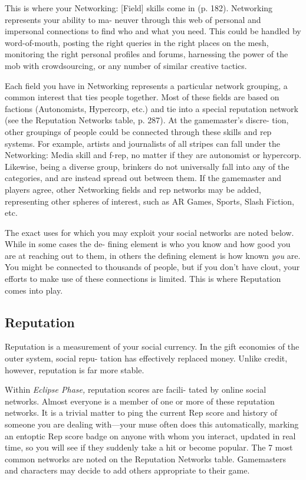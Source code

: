 This is where your Networking: [Field] skills come 
in (p. 182). Networking represents your ability to ma-
neuver through this web of personal and impersonal 
connections to find who and what you need. This 
could be handled by word-of-mouth, posting the right 
queries in the right places on the mesh, monitoring 
the right personal profiles and forums, harnessing the 
power of the mob with crowdsourcing, or any number 
of similar creative tactics.

Each field you have in Networking represents a 
particular network grouping, a common interest that 
ties people together. Most of these fields are based 
on factions (Autonomists, Hypercorp, etc.) and tie 
into a special reputation network (see the Reputation 
Networks table, p. 287). At the gamemaster's discre-
tion, other groupings of people could be connected 
through these skills and rep systems. For example, 
artists and journalists of all stripes can fall under 
the Networking: Media skill and f-rep, no matter if 
they are autonomist or hypercorp. Likewise, being a 
diverse group, brinkers do not universally fall into any 
of the categories, and are instead spread out between 
them. If the gamemaster and players agree, other 
Networking fields and rep networks may be added, 
representing other spheres of interest, such as AR 
Games, Sports, Slash Fiction, etc.

The exact uses for which you may exploit your social 
networks are noted below. While in some cases the de-
fining element is who you know and how good you are 
at reaching out to them, in others the defining element 
is how known \textit{you} are. You might be connected to 
thousands of people, but if you don't have clout, your 
efforts to make use of these connections is limited. This 
is where Reputation comes into play.

\subsection{Reputation}

Reputation is a measurement of your social currency. 
In the gift economies of the outer system, social repu-
tation has effectively replaced money. Unlike credit, 
however, reputation is far more stable.

Within \textit{Eclipse Phase,} reputation scores are facili-
tated by online social networks. Almost everyone is a 
member of one or more of these reputation networks. 
It is a trivial matter to ping the current Rep score and 
history of someone you are dealing with—your muse 
often does this automatically, marking an entoptic 
Rep score badge on anyone with whom you interact, 
updated in real time, so you will see if they suddenly 
take a hit or become popular. The 7 most common 
networks are noted on the Reputation Networks 
table. Gamemasters and characters may decide to add 
others appropriate to their game.

